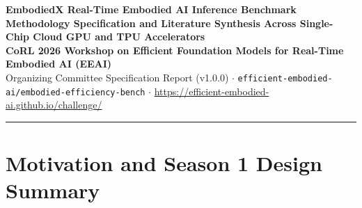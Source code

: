 \documentclass[10pt,letterpaper]{article}
\begin{document}
\nocite{Patel2025inferencemax,Patel2026inferencexv2,Patel2026agentx,Zhao2023learning,Chi2024diffusion,Black2024pi0,PhysicalIntelligence2025pi05,Bjorck2025gr00t,Kim2025finetuning,Black2025realtime,Liu2023libero,Li2024evaluating,Mees2022calvin,Stanford2026behavior,Ramstedt2019realtime,Xiao2020thinking,Tang2025vlash,Black2025trainingtime,Agouzoul2026understanding,AllenAI2026vlaeval,Kaul2012realtime,Costa2016age,Yates2021age,Shukor2025smolvla,NVIDIA2025cosmos,Qwen2025qwen3omni,Liao2025genie,Fei2025liberoplus,Zhang2025vlaarena,MLCommons2026power,Chung2025mlenergy,Luccioni2025aienergy,Yue2024deervla,Williams2009roofline,Reddi2020mlperf,Mereu2025generative,MayoralVilches2024robotperf,Yue2025ewmbench,Duan2025worldscore,Shang2026worldarena,Shang2026worldarena2,Xu2025vlacache,Yang2025efficientvla,Tan2025think,Wang2025specvla,Pertsch2025fast,Atreya2025roboarena,Yates2019age,Ramstedt2020reinforcement,Riemer2024enabling,Jiang2025streaming,Guan2025efficient,Yu2025survey,Zhang2025experiences,Sendai2025a2c2,Wang2025bitvla,Chen2025fisvla,Wen2024tinyvla,Chen2024diffusionforcing,Yin2025causvid,Huang2025selfforcing,Valevski2024gamengen,He2025matrixgame2,Xi2025sparsevideogen,Li2025radialattention,Zhou2024dinowm,Boroujerdian2018mavbench,Tao2024maniskill3}

\begin{center}
    {\LARGE\bfseries\color{navy} EmbodiedX Real-Time Embodied AI Inference Benchmark}\\[0.35em]
    {\normalsize\bfseries\color{slate} Methodology Specification and Literature Synthesis Across Single-Chip Cloud GPU and TPU Accelerators}\\[0.35em]
    {\small \textbf{CoRL 2026 Workshop on Efficient Foundation Models for Real-Time Embodied AI (EEAI)}\\
    Organizing Committee Specification Report (v1.0.0) $\cdot$ \texttt{efficient-embodied-ai/embodied-efficiency-bench} $\cdot$ \url{https://efficient-embodied-ai.github.io/challenge/}}
\end{center}
\vspace{0.2em}
\hrule
\vspace{0.4em}

\section{Motivation and Season 1 Design Summary}
\end{document}
